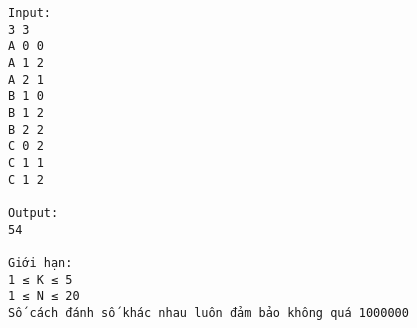 \begin{verbatim}
Input:
3 3
A 0 0
A 1 2
A 2 1
B 1 0
B 1 2
B 2 2
C 0 2
C 1 1
C 1 2

Output:
54

Giới hạn:
1 ≤ K ≤ 5
1 ≤ N ≤ 20
Số cách đánh số khác nhau luôn đảm bảo không quá 1000000

\end{verbatim}